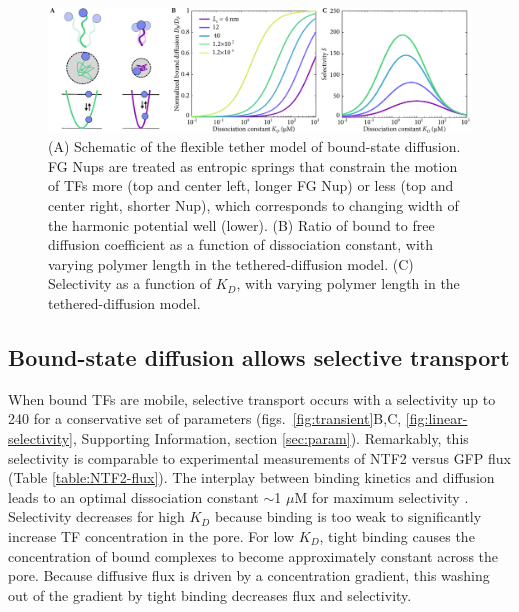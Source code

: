 \begin{figure}
\centering
\includegraphics[width=\textwidth]{figs/ch02/fig3.pdf}
\caption{(A) Schematic of the flexible tether model of bound-state
  diffusion. FG Nups are treated as entropic springs that constrain
  the motion of TFs more (top and center left, longer FG Nup) or less
  (top and center right, shorter Nup), which corresponds to changing
  width of the harmonic potential well (lower).  (B) Ratio of bound to
  free diffusion coefficient as a function of dissociation constant,
  with varying polymer length in the tethered-diffusion model.  (C)
  Selectivity as a function of $K_D$, with varying polymer length in
  the tethered-diffusion model.}
\label{fig:tethers}
\end{figure}


\subsection*{Bound-state diffusion allows selective transport}
When bound TFs are mobile, selective transport occurs with a
selectivity up to 240 for a conservative set of parameters
(figs.~\ref{fig:transient}B,C, \ref{fig:linear-selectivity},
Supporting Information, section \ref{sec:param}).  Remarkably, this
selectivity is comparable to experimental measurements of NTF2 versus
GFP flux (Table \ref{table:NTF2-flux}).  The interplay between binding
kinetics and diffusion leads to an optimal dissociation constant
$\sim$1 $\mu$M for maximum selectivity .
Selectivity decreases for high $K_D$ because binding is too weak to
significantly increase TF concentration in the pore.  For low $K_D$,
tight binding causes the concentration of bound complexes to become
approximately constant across the pore. Because diffusive flux is
driven by a concentration gradient, this washing out of the gradient
by tight binding decreases flux and selectivity.

